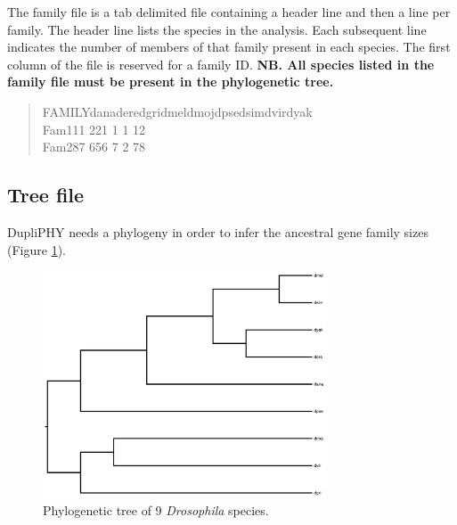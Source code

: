 \documentclass[10pt]{report}
\newcommand{\tab}{\hspace*{2em}}
\begin{document}
The family file is a tab delimited file containing a header line and then a line per family. The header line lists the species in the analysis. Each subsequent line indicates the number of members of that family present in each species. The first column of the file is reserved for a family ID. {\bf NB. All species listed in the family file must be present in the phylogenetic tree.}

\begin{quote}

FAMILY\tab dana\tab dere\tab dgri\tab dmel\tab dmoj\tab dpse\tab dsim\tab dvir\tab dyak\\
Fam1\tab\tab 1\tab\tab	1\tab\hspace{1em} 2\tab\tab	2\tab\tab	1\tab\hspace{1em}	1\tab\hspace{1em} 1\tab\hspace{1em}	1\tab\tab	2\\
Fam2\tab\tab 8\tab\tab	7\tab\hspace{1em} 6\tab\tab	5\tab\tab	6\tab\hspace{1em}	7\tab\hspace{1em} 2\tab\hspace{1em}	7\tab\tab	8\\

\end{quote}

\subsection{Tree file}
\label{sec:tree}

DupliPHY needs a phylogeny in order to infer the ancestral gene family sizes (Figure \ref{fig:tree}).

\begin{figure}
\centering
\includegraphics[width=0.75\textwidth]{tree.pdf}
\caption{Phylogenetic tree of 9 {\it Drosophila} species.}
\label{fig:tree}
\end{figure}
\end{document}
